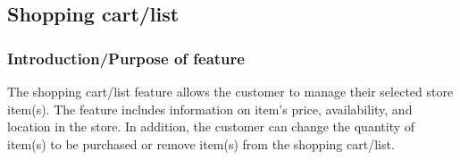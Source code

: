 \documentclass{scrreprt}
\theoremstyle{funreq}
\begin{document}

	\subsection{Shopping cart/list}
	\subsubsection{Introduction/Purpose of feature}
	The shopping cart/list feature allows the customer to manage their selected store item(s). The feature includes information on item's price, availability, and location in the store. In addition, the customer can change the quantity of item(s) to be purchased or remove item(s) from the shopping cart/list.
	
%	
	
	
\end{document}
